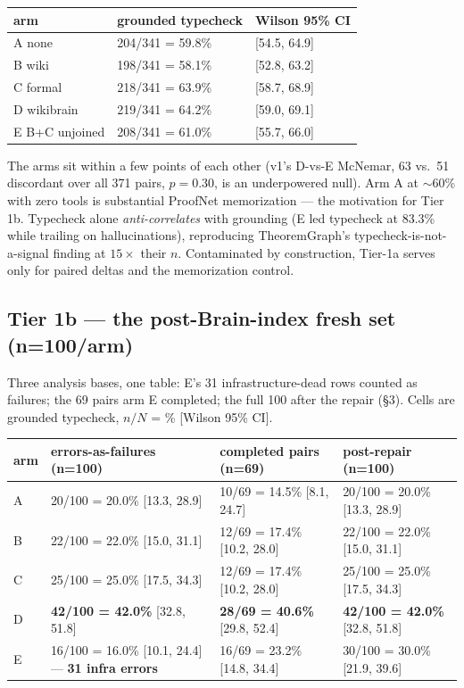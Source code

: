 \documentclass[10pt]{article}
\newcommand{\best}[1]{\textbf{#1}}
\begin{document}
\begin{center}
\footnotesize
\begin{tabular}{@{}lll@{}}
\toprule
arm & grounded typecheck & Wilson 95\% CI \\
\midrule
A none & 204/341 = 59.8\% & [54.5, 64.9] \\
B wiki & 198/341 = 58.1\% & [52.8, 63.2] \\
C formal & 218/341 = 63.9\% & [58.7, 68.9] \\
D wikibrain & 219/341 = 64.2\% & [59.0, 69.1] \\
E B+C unjoined & 208/341 = 61.0\% & [55.7, 66.0] \\
\bottomrule
\end{tabular}
\end{center}

The arms sit within a few points of each other (v1's D-vs-E McNemar,
63 vs.\ 51 discordant over all 371 pairs, $p=0.30$, is an underpowered
null). Arm A at ${\sim}$60\% with zero tools is substantial ProofNet
memorization --- the motivation for Tier 1b. Typecheck alone
\emph{anti-correlates} with grounding (E led typecheck at 83.3\% while
trailing on hallucinations), reproducing TheoremGraph's
typecheck-is-not-a-signal finding at $15\times$ their $n$. Contaminated by
construction, Tier-1a serves only for paired deltas and the memorization
control.

\subsection{Tier 1b --- the post-Brain-index fresh set (n=100/arm)}\label{sec:tier1b}

Three analysis bases, one table: E's 31 infrastructure-dead rows counted
as failures; the 69 pairs arm E completed; the full 100 after the repair
(\S3). Cells are grounded typecheck, $n/N$ = \% [Wilson 95\% CI].

\begin{center}
\footnotesize
\begin{tabular}{@{}lp{}p{}p{}@{}}
\toprule
arm & errors-as-failures (n=100) & completed pairs (n=69) & post-repair (n=100) \\
\midrule
A & 20/100 = 20.0\% [13.3, 28.9] & 10/69 = 14.5\% [8.1, 24.7] & 20/100 = 20.0\% [13.3, 28.9] \\
B & 22/100 = 22.0\% [15.0, 31.1] & 12/69 = 17.4\% [10.2, 28.0] & 22/100 = 22.0\% [15.0, 31.1] \\
C & 25/100 = 25.0\% [17.5, 34.3] & 12/69 = 17.4\% [10.2, 28.0] & 25/100 = 25.0\% [17.5, 34.3] \\
D & \best{42/100 = 42.0\%} [32.8, 51.8] & \best{28/69 = 40.6\%} [29.8, 52.4] & \best{42/100 = 42.0\%} [32.8, 51.8] \\
E & 16/100 = 16.0\% [10.1, 24.4] --- \best{31 infra errors} & 16/69 = 23.2\% [14.8, 34.4] & 30/100 = 30.0\% [21.9, 39.6] \\
\bottomrule
\end{tabular}
\end{center}
\end{document}
